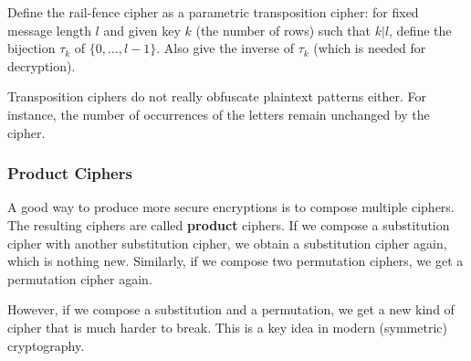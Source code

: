 \begin{exercise}\label{exc:sd:railfence}
Define the rail-fence cipher as a parametric transposition cipher: for fixed message length $l$ and given key $k$ (the number of rows) such that $k|l$, define the bijection $\tau_k$ of $\{0,\ldots,l-1\}$.
Also give the inverse of $\tau_k$ (which is needed for decryption).
\end{exercise}

Transposition ciphers do not really obfuscate plaintext patterns either.
For instance, the number of occurrences of the letters remain unchanged by the cipher.

\subsubsection{Product Ciphers}
 
A good way to produce more secure encryptions is to compose multiple ciphers.
The resulting ciphers are called \textbf{product} ciphers.
If we compose a substitution cipher with another substitution cipher, we obtain a substitution cipher again, which is nothing new.
Similarly, if we compose two permutation ciphers, we get a permutation cipher again.

However, if we compose a substitution and a permutation, we get a new kind of cipher that is much harder to break.
This is a key idea in modern (symmetric) cryptography. 
